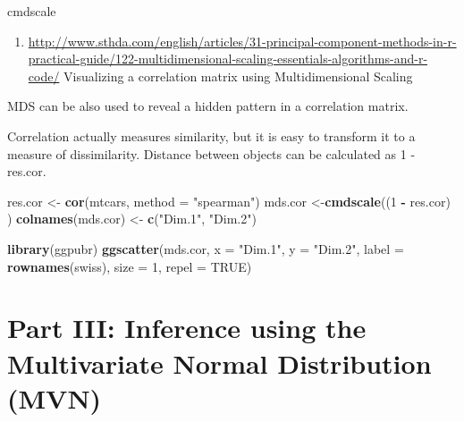 \documentclass[]{book}
\newenvironment{Shaded}{\begin{snugshade}}{\end{snugshade}}
\newcommand{\DataTypeTok}[1]{\textcolor[rgb]{0.13,0.29,0.53}{#1}}
\newcommand{\DecValTok}[1]{\textcolor[rgb]{0.00,0.00,0.81}{#1}}
\newcommand{\KeywordTok}[1]{\textcolor[rgb]{0.13,0.29,0.53}{\textbf{#1}}}
\newcommand{\NormalTok}[1]{#1}
\newcommand{\OperatorTok}[1]{\textcolor[rgb]{0.81,0.36,0.00}{\textbf{#1}}}
\newcommand{\OtherTok}[1]{\textcolor[rgb]{0.56,0.35,0.01}{#1}}
\newcommand{\StringTok}[1]{\textcolor[rgb]{0.31,0.60,0.02}{#1}}
\providecommand{\tightlist}{%
  \setlength{\itemsep}{0pt}\setlength{\parskip}{0pt}}
\theoremstyle{definition}
\theoremstyle{definition}
\theoremstyle{definition}
\theoremstyle{remark}
\begin{document}
\begin{Shaded}
\begin{Highlighting}[]
\NormalTok{cmdscale}
\end{Highlighting}
\end{Shaded}

\begin{enumerate}
\def\labelenumi{\arabic{enumi}.}
\setcounter{enumi}{2}
\tightlist
\item
  \url{http://www.sthda.com/english/articles/31-principal-component-methods-in-r-practical-guide/122-multidimensional-scaling-essentials-algorithms-and-r-code/}
  Visualizing a correlation matrix using Multidimensional Scaling
\end{enumerate}

MDS can be also used to reveal a hidden pattern in a correlation matrix.

Correlation actually measures similarity, but it is easy to transform it to a measure of dissimilarity. Distance between objects can be calculated as 1 - res.cor.

\begin{Shaded}
\begin{Highlighting}[]
\NormalTok{res.cor <-}\StringTok{ }\KeywordTok{cor}\NormalTok{(mtcars, }\DataTypeTok{method =} \StringTok{"spearman"}\NormalTok{)}
\NormalTok{mds.cor <-}\KeywordTok{cmdscale}\NormalTok{((}\DecValTok{1} \OperatorTok{-}\StringTok{ }\NormalTok{res.cor) ) }
\KeywordTok{colnames}\NormalTok{(mds.cor) <-}\StringTok{ }\KeywordTok{c}\NormalTok{(}\StringTok{"Dim.1"}\NormalTok{, }\StringTok{"Dim.2"}\NormalTok{)}

\KeywordTok{library}\NormalTok{(ggpubr)}
\KeywordTok{ggscatter}\NormalTok{(mds.cor, }\DataTypeTok{x =} \StringTok{"Dim.1"}\NormalTok{, }\DataTypeTok{y =} \StringTok{"Dim.2"}\NormalTok{, }
          \DataTypeTok{label =} \KeywordTok{rownames}\NormalTok{(swiss),}
          \DataTypeTok{size =} \DecValTok{1}\NormalTok{,}
          \DataTypeTok{repel =} \OtherTok{TRUE}\NormalTok{)}
\end{Highlighting}
\end{Shaded}

\hypertarget{part-iii-inference-using-the-multivariate-normal-distribution-mvn}{%
\chapter*{Part III: Inference using the Multivariate Normal Distribution (MVN)}\label{part-iii-inference-using-the-multivariate-normal-distribution-mvn}}
\end{document}
